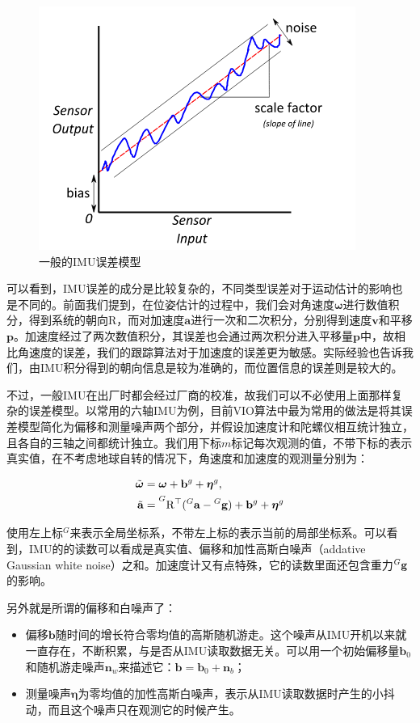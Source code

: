 \begin{figure}[htb]
    \centering
    \includegraphics[width=.3\textwidth]{./figs/common_imu_errors.png}
    \caption{一般的IMU误差模型\citep{imu2014}}
    \label{fig:common_imu_errors}
\end{figure}

可以看到，IMU误差的成分是比较复杂的，不同类型误差对于运动估计的影响也是不同的。前面我们提到，在位姿估计的过程中，我们会对角速度$\bm\omega$进行数值积分，得到系统的朝向$\mathrm{R}$，而对加速度$\mathbf{a}$进行一次和二次积分，分别得到速度$\mathbf{v}$和平移$\mathbf{p}$。加速度经过了两次数值积分，其误差也会通过两次积分进入平移量$\mathbf{p}$中，故相比角速度的误差，我们的跟踪算法对于加速度的误差更为敏感。实际经验也告诉我们，由IMU积分得到的朝向信息是较为准确的，而位置信息的误差则是较大的。

不过，一般IMU在出厂时都会经过厂商的校准，故我们可以不必使用上面那样复杂的误差模型。以常用的六轴IMU为例，目前VIO算法中最为常用的做法是将其误差模型简化为偏移和测量噪声两个部分，并假设加速度计和陀螺仪相互统计独立，且各自的三轴之间都统计独立。我们用下标$m$标记每次观测的值，不带下标的表示真实值，在不考虑地球自转的情况下，角速度和加速度的观测量分别为\citep{mourikis2007multi}：

\begin{equation}
\begin{aligned}
    \tilde{\bm\omega} &= \bm\omega + \mathbf{b}^g + \bm\eta^g,  \\
    \tilde{\mathbf a} &= \prescript{G}{}{\mathrm{R}^\top}
                         (\prescript{G}{}{\mathbf a} - \prescript{G}{}{\mathbf g}) +
                         \mathbf{b}^g + \bm\eta^g
\end{aligned}
\end{equation}

使用左上标$^G$来表示全局坐标系，不带左上标的表示当前的局部坐标系。可以看到，IMU的的读数可以看成是真实值、偏移和加性高斯白噪声（addative Gaussian white noise）之和。加速度计又有点特殊，它的读数里面还包含重力$\prescript{G}{}{\mathbf g}$的影响。

另外就是所谓的偏移和白噪声了：
\begin{itemize}
    \item 偏移$\mathbf{b}$随时间的增长符合零均值的高斯随机游走。这个噪声从IMU开机以来就一直存在，不断积累，与是否从IMU读取数据无关。可以用一个初始偏移量$\mathbf{b}_0$和随机游走噪声$\mathbf{n}_w$来描述它：$\mathbf{b} = \mathbf{b}_0 + \mathbf{n}_b$；
    \item 测量噪声$\bm\eta$为零均值的加性高斯白噪声，表示从IMU读取数据时产生的小抖动，而且这个噪声只在观测它的时候产生。
\end{itemize}

